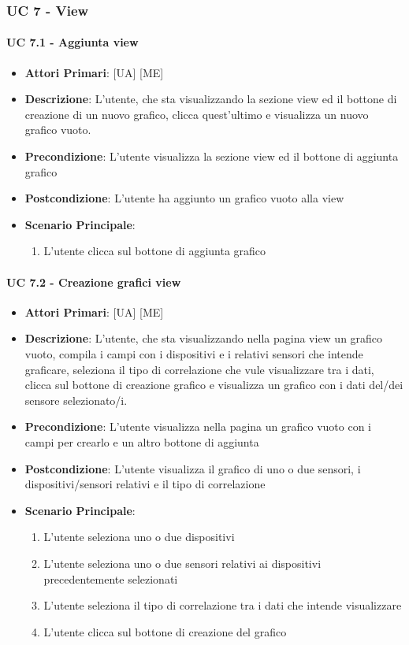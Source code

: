 		\subsubsection{UC 7 - View}

			\paragraph{UC 7.1 - Aggiunta view}
			\begin{itemize}
				\item \textbf{Attori Primari}: [UA] [ME]
				\item \textbf{Descrizione}: L'utente, che sta visualizzando la sezione view ed il bottone di creazione di un nuovo grafico, clicca quest'ultimo e visualizza un nuovo grafico vuoto.
				\item \textbf{Precondizione}: L'utente visualizza la sezione view ed il bottone di aggiunta grafico
				\item \textbf{Postcondizione}: L'utente ha aggiunto un grafico vuoto alla view
				\item \textbf{Scenario Principale}:
				\begin{enumerate}
					\item{L'utente clicca sul bottone di aggiunta grafico}
				\end{enumerate}	
			\end{itemize}

			\paragraph{UC 7.2 - Creazione grafici view}
			\begin{itemize}
				\item \textbf{Attori Primari}: [UA] [ME]
				\item \textbf{Descrizione}: L'utente, che sta visualizzando nella pagina view un grafico vuoto, compila i campi con i dispositivi e i relativi sensori che intende graficare, seleziona il tipo di correlazione che vule visualizzare tra i dati, clicca sul bottone di creazione grafico e visualizza un grafico con i dati del/dei sensore selezionato/i.
				\item \textbf{Precondizione}: L'utente visualizza nella pagina un grafico vuoto con i campi per crearlo e un altro bottone di aggiunta
				\item \textbf{Postcondizione}: L'utente visualizza il grafico di uno o due sensori, i dispositivi/sensori relativi e il tipo di correlazione 
				\item \textbf{Scenario Principale}:
				\begin{enumerate}
					\item{L'utente seleziona uno o due dispositivi}
					\item{L'utente seleziona uno o due sensori relativi ai dispositivi precedentemente selezionati}
					\item{L'utente seleziona il tipo di correlazione tra i dati che intende visualizzare}
					\item{L'utente clicca sul bottone di creazione del grafico}
				\end{enumerate}	
			\end{itemize}

